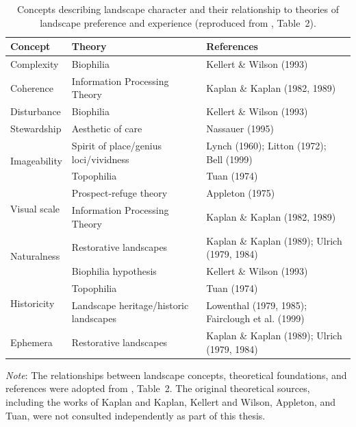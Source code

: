 \documentclass[11pt]{article}
\renewcommand{\_}{\textunderscore\allowbreak{}}
\begin{document}
\begin{table}[htbp]
\centering
\caption{Concepts describing landscape character and their relationship to theories of landscape preference and experience (reproduced from \citet{ode_capturing_2008}, Table~2).}
\label{tab:ode_concepts}
\renewcommand{\arraystretch}{1.25}
\begin{tabular}{@{}l l l@{}}
\toprule
Concept & Theory & References \\
\midrule
Complexity   & Biophilia                                  & Kellert \& Wilson (1993) \\
Coherence    & Information Processing Theory              & Kaplan \& Kaplan (1982, 1989) \\
Disturbance  & Biophilia                                  & Kellert \& Wilson (1993) \\
Stewardship  & Aesthetic of care                          & Nassauer (1995) \\
\multirow{2}{*}{Imageability} & Spirit of place/genius loci/vividness & Lynch (1960); Litton (1972); Bell (1999) \\
             & Topophilia                                 & Tuan (1974) \\
\multirow{2}{*}{Visual scale} & Prospect-refuge theory               & Appleton (1975) \\
             & Information Processing Theory              & Kaplan \& Kaplan (1982, 1989) \\
\multirow{2}{*}{Naturalness}  & Restorative landscapes               & Kaplan \& Kaplan (1989); Ulrich (1979, 1984) \\
             & Biophilia hypothesis                       & Kellert \& Wilson (1993) \\
\multirow{2}{*}{Historicity}  & Topophilia                           & Tuan (1974) \\
             & Landscape heritage/historic landscapes     & Lowenthal (1979, 1985); Fairclough et al. (1999) \\
Ephemera     & Restorative landscapes                     & Kaplan \& Kaplan (1989); Ulrich (1979, 1984) \\
\bottomrule
\end{tabular}

\vspace{0.3em}
\begin{minipage}{0.9\linewidth}
\footnotesize
\textit{Note}: The relationships between landscape concepts, theoretical foundations, and references were adopted from \citet{ode_capturing_2008}, Table~2. The original theoretical sources, including the works of Kaplan and Kaplan, Kellert and Wilson, Appleton, and Tuan, were not consulted independently as part of this thesis.
\end{minipage}
\end{table}
\end{document}
